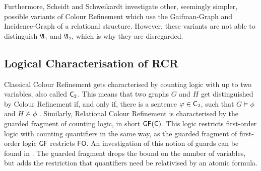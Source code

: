 Furthermore, Scheidt and Schweikardt investigate other, seemingly simpler, possible variants of Colour Refinement which use the Gaifman-Graph and Incidence-Graph of a relational structure.
However, these variants are not able to distinguish $\mathfrak A_1$ and $\mathfrak A_2$, which is why they are disregarded.

\subsection{Logical Characterisation of RCR}

Classical Colour Refinement gets characterised by counting logic with up to two variables, also called $\mathsf{C}_{2}$.
This means that two graphs $G$ and $H$ get distinguished by Colour Refinement if, and only if, there is a sentence $\varphi\in \mathsf{C}_{2}$, such that $G\models \phi$ and $H\not\models \phi$ \cite{immerman1990DescribingGraphs}.
Similarly, Relational Colour Refinement is characterised by the guarded fragment of counting logic, in short $\mathsf{GF}(\mathsf{C})$.
This logic restricts first-order logic with counting quantifiers in the same way, as the guarded fragment of first-order logic $\mathsf{GF}$ restricts $\mathsf{FO}$.
An investigation of this notion of guards can be found in \cite{gradel1999RestrainingPower}.
The guarded fragment drops the bound on the number of variables, but adds the restriction that quantifiers need be relativised by an atomic formula.

